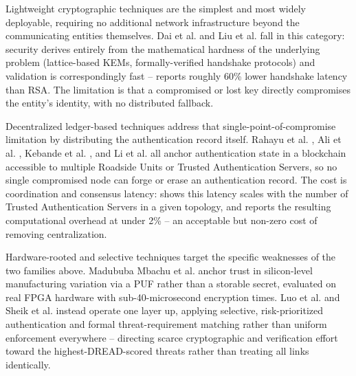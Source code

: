 \documentclass[journal]{IEEEtran}
\begin{document}
	Lightweight cryptographic techniques are the simplest and most widely
	deployable, requiring no additional network infrastructure beyond the
	communicating entities themselves. Dai et al. \cite{ref13} and Liu et
	al. \cite{ref14} fall in this category: security derives entirely from
	the mathematical hardness of the underlying problem (lattice-based
	KEMs, formally-verified handshake protocols) and validation is
	correspondingly fast -- \cite{ref13} reports roughly 60\% lower
	handshake latency than RSA. The limitation is that a compromised or
	lost key directly compromises the entity's identity, with no
	distributed fallback.
	
	Decentralized ledger-based techniques address that single-point-of-compromise
	limitation by distributing the authentication record itself. Rahayu et
	al. \cite{ref17}, Ali et al. \cite{ref18}, Kebande et al. \cite{ref19},
	and Li et al. \cite{ref20} all anchor authentication state in a
	blockchain accessible to multiple Roadside Units or Trusted
	Authentication Servers, so no single compromised node can forge or
	erase an authentication record. The cost is coordination and consensus
	latency: \cite{ref17} shows this latency scales with the number of
	Trusted Authentication Servers in a given topology, and \cite{ref18}
	reports the resulting computational overhead at under 2\% -- an
	acceptable but non-zero cost of removing centralization.
	
	Hardware-rooted and selective techniques target the specific
	weaknesses of the two families above. Madububa Mbachu et al.
	\cite{ref22} anchor trust in silicon-level manufacturing variation via
	a PUF rather than a storable secret, evaluated on real FPGA hardware
	with sub-40-microsecond encryption times. Luo et al. \cite{ref29} and
	Sheik et al. \cite{ref30} instead operate one layer up, applying
	selective, risk-prioritized authentication and formal
	threat-requirement matching rather than uniform enforcement everywhere
	-- directing scarce cryptographic and verification effort toward the
	highest-DREAD-scored threats rather than treating all links
	identically.
	
\end{document}
